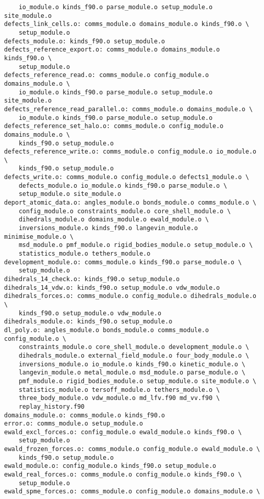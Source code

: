 \begin{verbatim}
	io_module.o kinds_f90.o parse_module.o setup_module.o site_module.o
defects_link_cells.o: comms_module.o domains_module.o kinds_f90.o \
	setup_module.o
defects_module.o: kinds_f90.o setup_module.o
defects_reference_export.o: comms_module.o domains_module.o kinds_f90.o \
	setup_module.o
defects_reference_read.o: comms_module.o config_module.o domains_module.o \
	io_module.o kinds_f90.o parse_module.o setup_module.o site_module.o
defects_reference_read_parallel.o: comms_module.o domains_module.o \
	io_module.o kinds_f90.o parse_module.o setup_module.o
defects_reference_set_halo.o: comms_module.o config_module.o domains_module.o \
	kinds_f90.o setup_module.o
defects_reference_write.o: comms_module.o config_module.o io_module.o \
	kinds_f90.o setup_module.o
defects_write.o: comms_module.o config_module.o defects1_module.o \
	defects_module.o io_module.o kinds_f90.o parse_module.o \
	setup_module.o site_module.o
deport_atomic_data.o: angles_module.o bonds_module.o comms_module.o \
	config_module.o constraints_module.o core_shell_module.o \
	dihedrals_module.o domains_module.o ewald_module.o \
	inversions_module.o kinds_f90.o langevin_module.o minimise_module.o \
	msd_module.o pmf_module.o rigid_bodies_module.o setup_module.o \
	statistics_module.o tethers_module.o
development_module.o: comms_module.o kinds_f90.o parse_module.o \
	setup_module.o
dihedrals_14_check.o: kinds_f90.o setup_module.o
dihedrals_14_vdw.o: kinds_f90.o setup_module.o vdw_module.o
dihedrals_forces.o: comms_module.o config_module.o dihedrals_module.o \
	kinds_f90.o setup_module.o vdw_module.o
dihedrals_module.o: kinds_f90.o setup_module.o
dl_poly.o: angles_module.o bonds_module.o comms_module.o config_module.o \
	constraints_module.o core_shell_module.o development_module.o \
	dihedrals_module.o external_field_module.o four_body_module.o \
	inversions_module.o io_module.o kinds_f90.o kinetic_module.o \
	langevin_module.o metal_module.o msd_module.o parse_module.o \
	pmf_module.o rigid_bodies_module.o setup_module.o site_module.o \
	statistics_module.o tersoff_module.o tethers_module.o \
	three_body_module.o vdw_module.o md_lfv.f90 md_vv.f90 \
	replay_history.f90
domains_module.o: comms_module.o kinds_f90.o
error.o: comms_module.o setup_module.o
ewald_excl_forces.o: config_module.o ewald_module.o kinds_f90.o \
	setup_module.o
ewald_frozen_forces.o: comms_module.o config_module.o ewald_module.o \
	kinds_f90.o setup_module.o
ewald_module.o: config_module.o kinds_f90.o setup_module.o
ewald_real_forces.o: comms_module.o config_module.o kinds_f90.o \
	setup_module.o
ewald_spme_forces.o: comms_module.o config_module.o domains_module.o \

\end{verbatim}
